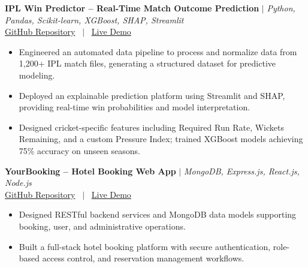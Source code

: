 \documentclass[10pt, a4paper]{article}
\begin{document}
\textbf{IPL Win Predictor -- Real-Time Match Outcome Prediction} $|$ \textit{Python, Pandas, Scikit-learn, XGBoost, SHAP, Streamlit} \\

\small{
\href{https://github.com}{GitHub Repository}
 \ $|$ \ \href{https://demo.example.com}{Live Demo}
} \\

\begin{itemize}

    \item Engineered an automated data pipeline to process and normalize data from 1,200+ IPL match files, generating a structured dataset for predictive modeling.

    \item Deployed an explainable prediction platform using Streamlit and SHAP, providing real-time win probabilities and model interpretation.

    \item Designed cricket-specific features including Required Run Rate, Wickets Remaining, and a custom Pressure Index; trained XGBoost models achieving 75\% accuracy on unseen seasons.

\end{itemize}
\vspace{2pt}

\textbf{YourBooking -- Hotel Booking Web App} $|$ \textit{MongoDB, Express.js, React.js, Node.js} \\

\small{
\href{https://github.com}{GitHub Repository}
 \ $|$ \ \href{https://demo.example.com}{Live Demo}
} \\

\begin{itemize}

    \item Designed RESTful backend services and MongoDB data models supporting booking, user, and administrative operations.

    \item Built a full-stack hotel booking platform with secure authentication, role-based access control, and reservation management workflows.

\end{itemize}
\vspace{2pt}


\end{document}
